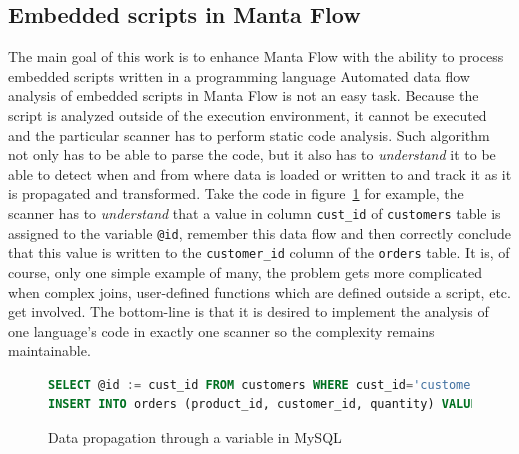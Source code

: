 \subsection{Embedded scripts in Manta Flow}

The main goal of this work is to enhance Manta Flow with the ability to process embedded scripts written in a programming language
Automated data flow analysis of embedded scripts in Manta Flow is not an easy task. Because the script is analyzed outside of the execution environment, it cannot be executed and the particular scanner has to perform static code analysis. Such algorithm not only has to be able to parse the code, but it also has to \textit{understand} it to be able to detect when and from where data is loaded or written to and track it as it is propagated and transformed. Take the code in figure~\ref{fig:sqlVariable} for example, the scanner has to \textit{understand} that a value in column \texttt{cust\_id} of \texttt{customers} table is assigned to the variable \texttt{@id}, remember this data flow and then correctly conclude that this value is written to the \texttt{customer\_id} column of the \texttt{orders} table. It is, of course, only one simple example of many, the problem gets more complicated when complex joins, user-defined functions which are defined outside a script, etc. get involved. The bottom-line is that it is desired to implement the analysis of one language's code in exactly one scanner so the complexity remains maintainable.

\begin{figure}[ht]
\begin{lstlisting}[language=SQL]
SELECT @id := cust_id FROM customers WHERE cust_id='customer name';
INSERT INTO orders (product_id, customer_id, quantity) VALUES (123, @id, 1);
\end{lstlisting}
\caption{Data propagation through a variable in MySQL}
\label{fig:sqlVariable}
\end{figure}

\par



